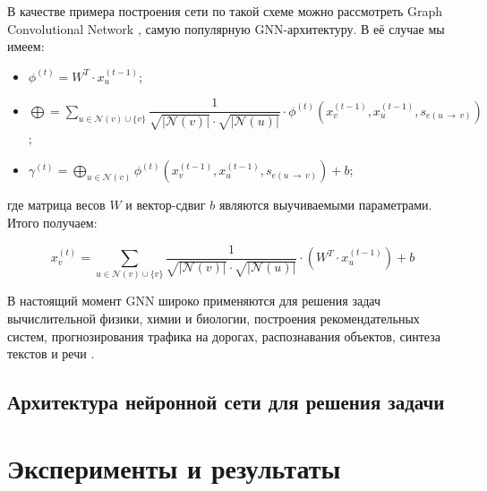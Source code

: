 В качестве примера построения сети по такой схеме можно рассмотреть Graph Convolutional Network \cite{gcn-conv-paper}, самую популярную GNN-архитектуру. В её случае мы имеем:

\begin{itemize}
    \item $\phi^{(t)} = W^T \cdot x_u^{(t - 1)}$;
    \item $\bigoplus = \sum \limits_{u \in \mathcal{N}(v) \cup \{v\}} \dfrac{1}{\sqrt{|\mathcal{N}(v)|} \cdot \sqrt{|\mathcal{N}(u)|}} \cdot \phi^{(t)} \left(x_v^{(t - 1)}, x_u^{(t - 1)}, s_{e(u \, \to \, v)} \right)$;
    \item $\gamma^{(t)} = \bigoplus \limits_{u \in \mathcal{N}(v)} \phi^{(t)} \left(x_v^{(t - 1)}, x_u^{(t - 1)}, s_{e(u \, \to \, v)} \right) + b$;
\end{itemize}

\noindent где матрица весов $W$ и вектор-сдвиг $b$ являются выучиваемыми параметрами. Итого получаем:

\begin{equation}
    x_v^{(t)} = \sum \limits_{u \in \mathcal{N}(v) \cup \{v\}} \dfrac{1}{\sqrt{|\mathcal{N}(v)|} \cdot \sqrt{|\mathcal{N}(u)|}} \cdot \left(W^T \cdot x_u^{(t - 1)} \right) + b
\end{equation}

В настоящий момент GNN широко применяются для решения задач вычислительной физики, химии и биологии, построения рекомендательных систем, прогнозирования трафика на дорогах, распознавания объектов, синтеза текстов и речи \cite{gnn-global-overview} \cite{gnn-deep-learning-5g}.

\subsection{Архитектура нейронной сети для решения задачи}




\section{Эксперименты и результаты}

